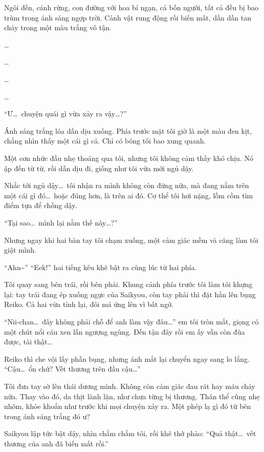 \documentclass[../main.tex]{subfiles}
\begin{document}
Ngôi đền, cánh rừng, con đường với hoa bỉ ngạn, cả bốn người, tất cả đều bị bao trùm trong ánh sáng ngợp trời. Cảnh vật rung động rồi biến mất, dần dần tan chảy trong một màu trắng vô tận.

\dots

\dots

\ct


\dots

\dots

``Ư\dots\ chuyện quái gì vừa xảy ra vậy\dots?''

Ánh sáng trắng lóa dần dịu xuống. Phía trước mặt tôi giờ là một màu đen kịt, chẳng nhìn thấy một cái gì cả. Chỉ có bóng tối bao xung quanh.

Một cơn nhức đầu nhẹ thoáng qua tôi, nhưng tôi không cảm thấy khó chịu. Nó ập đến từ từ, rồi dần dịu đi, giống như tôi vừa mới ngủ dậy.

Nhắc tới ngủ dậy\dots\ tôi nhận ra mình không còn đứng nữa, mà đang nằm trên một cái gì đó\dots\ hoặc đúng hơn, là trên ai đó. Cơ thể tôi hơi nặng, lồm cồm tìm điểm tựa để chống dậy.

``Tại sao\dots\ mình lại nằm thế này\dots?''

Nhưng ngay khi hai bàn tay tôi chạm xuống, một cảm giác mềm và căng làm tôi giật mình.

``Ahn\~{}'' ``Eek!'' hai tiếng kêu khẽ bật ra cùng lúc từ hai phía.

Tôi quay sang bên trái, rồi bên phải. Khung cảnh phía trước tôi làm tôi khựng lại: tay trái đang ép xuống ngực của Saikyou, còn tay phải thì đặt hẳn lên bụng Reiko. Cả hai vừa tỉnh lại, đôi má ửng lên vì bất ngờ.

``Nii-chan\dots\ đây không phải chỗ để anh làm vậy đâu\dots'' em tôi tròn mắt, giọng có một chút nổi cáu xen lẫn ngượng ngùng. Đến tận đây rồi em ấy vẫn còn đùa được, tài thật\dots

Reiko thì che vội lấy phần bụng, nhưng ánh mắt lại chuyển ngay sang lo lắng. ``Cậu\dots\ ổn chứ? Vết thương trên đầu cậu\dots''

Tôi đưa tay sờ lên thái dương mình. Không còn cảm giác đau rát hay máu chảy nữa. Thay vào đó, da thịt lành lặn, như chưa từng bị thương. Thân thể cũng nhẹ nhõm, khỏe khoắn như trước khi mọi chuyện xảy ra. Một phép lạ gì đó từ bên trong ánh sáng trắng đó ư?

Saikyou lập tức bật dậy, nhìn chằm chằm tôi, rồi khẽ thở phào: ``Quả thật\dots\ vết thương của anh đã biến mất rồi.''
\end{document}
